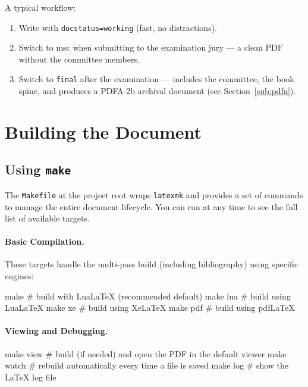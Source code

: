 A typical workflow:
\begin{enumerate}
  \item Write with \texttt{docstatus=working} (fast, no distractions).
  \item Switch to \gls{msc} when submitting to the examination
    jury — a clean \gls{PDF} without the committee members.

  \item Switch to \texttt{final} after the examination — includes the
    committee, the book spine, and produces a \gls{PDFA}-2b archival document
    (see Section~\ref{sub:pdfa}).
\end{enumerate}


\section{Building the Document}
\label{sec:building}

\subsection{Using \texttt{make}}
\label{sub:make}

The \texttt{Makefile} at the project root wraps \texttt{latexmk} and provides a set of commands to manage the entire document lifecycle. You can run  at any time to see the full list of available targets.

\paragraph{Basic Compilation.} These targets handle the multi-pass build (including bibliography) using specific engines:
\begin{bashcode}
make        # build with LuaLaTeX (recommended default)
make lua    # build using LuaLaTeX
make xe     # build using XeLaTeX
make pdf    # build using pdfLaTeX
\end{bashcode}

\paragraph{Viewing and Debugging.}
\begin{bashcode}
make view   # build (if needed) and open the PDF in the default viewer
make watch  # rebuild automatically every time a file is saved
make log    # show the LaTeX log file
\end{bashcode}

